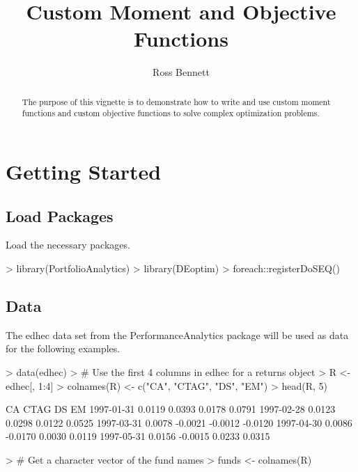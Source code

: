 \documentclass[a4paper]{article}
\begin{document}


\title{Custom Moment and Objective Functions}
\author{Ross Bennett}

\maketitle

\begin{abstract}
The purpose of this vignette is to demonstrate how to write and use custom moment functions and custom objective functions to solve complex optimization problems.
\end{abstract}

\tableofcontents

\section{Getting Started}
\subsection{Load Packages}
Load the necessary packages.

\begin{Schunk}
\begin{Sinput}
> library(PortfolioAnalytics)
> library(DEoptim)
> foreach::registerDoSEQ()
\end{Sinput}
\end{Schunk}

\subsection{Data}
The edhec data set from the PerformanceAnalytics package will be used as data for the following examples.
\begin{Schunk}
\begin{Sinput}
> data(edhec)
> # Use the first 4 columns in edhec for a returns object
> R <- edhec[, 1:4]
> colnames(R) <- c("CA", "CTAG", "DS", "EM")
> head(R, 5)
\end{Sinput}
\begin{Soutput}
               CA    CTAG      DS      EM
1997-01-31 0.0119  0.0393  0.0178  0.0791
1997-02-28 0.0123  0.0298  0.0122  0.0525
1997-03-31 0.0078 -0.0021 -0.0012 -0.0120
1997-04-30 0.0086 -0.0170  0.0030  0.0119
1997-05-31 0.0156 -0.0015  0.0233  0.0315
\end{Soutput}
\begin{Sinput}
> # Get a character vector of the fund names
> funds <- colnames(R)
\end{Sinput}
\end{Schunk}
\end{document}
